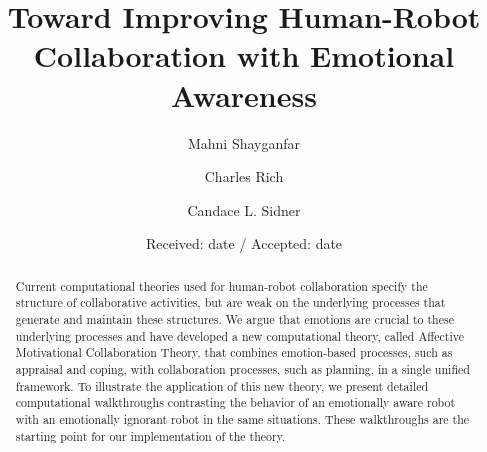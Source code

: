 \renewcommand{\labelitemi}{$\bullet$}

\title{Toward Improving Human-Robot Collaboration with Emotional Awareness}%



\author{Mahni Shayganfar \and
        Charles Rich \and
        Candace L. Sidner
}



\date{Received: date / Accepted: date}


\maketitle

\begin{abstract}

Current computational theories used for human-robot collaboration specify the
structure of collaborative activities, but are weak on the underlying processes
that generate and maintain these structures. We argue that emotions are crucial
to these underlying processes and have developed a new computational theory,
called Affective Motivational Collaboration Theory, that combines emotion-based
processes, such as appraisal and coping, with collaboration processes, such as
planning, in a single unified framework. To illustrate the application of this
new theory, we present detailed computational walkthroughs contrasting the
behavior of an emotionally aware robot with an emotionally ignorant robot in the
same situations.  These walkthroughs are the starting point for our
implementation of the theory.

\end{abstract}

